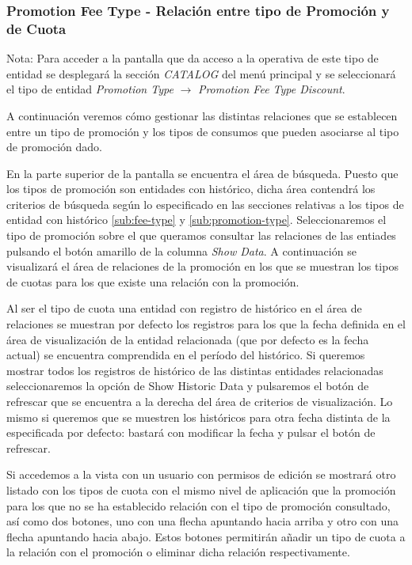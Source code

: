 \subsubsection{Promotion Fee Type - Relación entre tipo de Promoción y de Cuota}
\label{sub:promotion-fee-type-relation}

Nota: Para acceder a la pantalla que da acceso a la operativa de este tipo de entidad se desplegará la sección \emph{CATALOG} del menú principal y se seleccionará el tipo de entidad \emph{Promotion Type} $\rightarrow$  \emph{Promotion Fee Type Discount}.


A continuación veremos cómo gestionar las distintas relaciones que se establecen entre un tipo de promoción y los tipos de consumos que pueden asociarse al tipo de promoción dado.


En la parte superior de la pantalla se encuentra el área de búsqueda. Puesto que los tipos de promoción son entidades con histórico, dicha área contendrá los criterios de búsqueda según lo especificado en las secciones relativas a los tipos de entidad con histórico \ref{sub:fee-type} y \ref{sub:promotion-type}. 
Seleccionaremos el tipo de promoción sobre el que queramos consultar las relaciones de las entiades pulsando el botón amarillo de la columna \emph{Show Data}. A continuación se visualizará el área de relaciones de la promoción en los que se muestran los tipos de cuotas para los que existe una relación con la promoción.


Al ser el tipo de cuota una entidad con registro de histórico en el área de relaciones se muestran por defecto los registros para los que la fecha definida en el área de visualización de la entidad relacionada (que por defecto es la fecha actual) se encuentra comprendida en el período del histórico. Si queremos mostrar todos los registros de histórico de las distintas entidades relacionadas seleccionaremos la opción de Show Historic Data y pulsaremos el botón de refrescar que se encuentra a la derecha del área de criterios de visualización. Lo mismo si queremos que se muestren los históricos para otra fecha distinta de la especificada por defecto: bastará con modificar la fecha y pulsar el botón de refrescar.

Si accedemos a la vista con un usuario con permisos de edición se mostrará otro listado con los tipos de cuota con el mismo nivel de aplicación que la promoción para los que no se ha establecido relación con el tipo de promoción consultado, así como dos botones, uno con una flecha apuntando hacia arriba y otro con una flecha apuntando hacia abajo. Estos botones permitirán añadir un tipo de cuota a la relación con el promoción o eliminar dicha relación respectivamente. 

